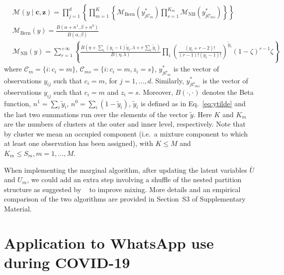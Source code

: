 \documentclass[11pt]{article}
\begin{document}
\small
\[
\begin{aligned}
&\mathcal{M}\left(y\mid \bm{c}, \bm{z}\right) =
\prod_{j=1}^{d}
\left\{\prod_{m=1}^K
\left\{\mathcal{M}_\mathrm{Bern}\left(y^*_{j \mathcal{C}_m}\right)\prod_{s=1}^{K_m} \mathcal{M}_\mathrm{NB}\left(y^*_{j \mathcal{C}_{ms}}\right)\right\}\right\} \\
&\mathcal{M}_\mathrm{Bern}\left(y\right) =\frac{B\left(\alpha + n^{1}, \beta + n^{0}\right)}{B(\alpha,\beta)}\\
&\mathcal{M}_\mathrm{NB}\left(y\right) =
\sum_{r=1}^{+\infty}
\left\{
\frac{B\left(\eta+ \sum_{i} \left(y_{i} - 1\right)\widetilde{y}_i,\lambda + r \, \sum_{i} \widetilde{y}_i\right)}{B\left(\eta,\lambda\right)} \prod\limits_{i} \left(\frac{\left(y_{i} + r - 2\right)!}{\left(r-1\right)!\left(y_{i}-1\right)!}\right)^{\widetilde{y}_i} \left(1-\zeta\right)^{r-1}\zeta \right\}
\end{aligned}
\]
\normalsize
where $\mathcal{C}_m = \{i: c_i=m\}$, $\mathcal{C}_{ms} = \{i: c_i=m,z_i=s\}$, $y^*_{j\mathcal{C}_m}$ is the vector of observations $y_{ij}$ such that $ c_i = m  $, for $j=1,\ldots,d$. Similarly, $y^*_{j \mathcal{C}_{ms}}$ is the vector of observations $y_{ij}$ such that $ c_i = m   $ and $ z_i=s$. Moreover, $B\left(\cdot,\cdot\right)$ denotes the Beta function, $n^{1} = \sum_{i} \widetilde{y}_{i}$, $n^{0} = \sum_{i} \left(1 - \widetilde{y}_{i}\right)$,  $\widetilde{y}_{i}$ is defined as in Eq.~\eqref{eq:ytilde} and the last two summations run over the elements of the vector $\widetilde{y}$. Here $K$ and $K_m$ are the numbers of clusters at the outer and inner level, respectively. Note that by cluster we mean an occupied component (i.e.\ a mixture component to which at least one observation has been assigned), with $K\leq M$ and $K_m\leq S_m,m=1,\ldots,M$. 

When implementing the marginal algorithm, after updating the latent variables $\bar U$ and $U_{m}$, we could add an extra step involving  a shuffle of the nested partition structure as suggested by ~\citet{wade2014improving} to improve mixing. More details and an empirical comparison of the two algorithms are provided in Section~S3 of Supplementary Material.%



\section{Application to WhatsApp use during COVID-19}\label{sec:Application}
\end{document}
